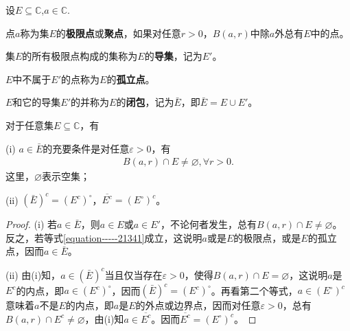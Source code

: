 \documentclass[../../main.tex]{subfiles}%
\begin{document}
\begin{definition}
设$E\subseteq \mathbb{C}$,$a\in \mathbb{C}$.

点\(a\)称为集\(E\)的\textbf{极限点}或\textbf{聚点}，如果对任意\(r > 0\)，\(B(a, r)\)中除\(a\)外总有\(E\)中的点。

集\(E\)的所有极限点构成的集称为\(E\)的\textbf{导集}，记为\(E'\)。

\(E\)中不属于\(E'\)的点称为\(E\)的\textbf{孤立点}。

\(E\)和它的导集\(E'\)的并称为\(E\)的\textbf{闭包}，记为\(\bar{E}\)，即\(\bar{E} = E \cup E'\)。
\end{definition}

\begin{proposition}\label{proposition:闭包的性质}
对于任意集\(E\subseteq \mathbb{C}\)，有

(i) \(a \in \bar{E}\)的充要条件是对任意\(\varepsilon > 0\)，有
\begin{align}
B(a, r) \cap E \neq \varnothing,\forall r>0.\label{equation-----21341}
\end{align}
这里，\(\varnothing\)表示空集；

(ii) \((\bar{E})^c = (E^c)^\circ\)，\(\overline{E^c} = (E^\circ)^c\)。
\end{proposition}
\begin{proof}

(i) 若\(a \in \bar{E}\)，则\(a \in E\)或\(a \in E'\)，不论何者发生，总有\(B(a, r) \cap E \neq \varnothing\)。反之，若等式\eqref{equation-----21341}成立，这说明\(a\)或是\(E\)的极限点，或是\(E\)的孤立点，因而\(a \in \bar{E}\)。

(ii) 由(i)知，\(a \in (\bar{E})^c\)当且仅当存在\(\varepsilon > 0\)，使得\(B(a, r) \cap E = \varnothing\)，这说明\(a\)是\(E^c\)的内点，即\(a \in (E^c)^\circ\)，因而\((\bar{E})^c = (E^c)^\circ\)。再看第二个等式，\(a \in (E^\circ)^c\)意味着\(a\)不是\(E\)的内点，即\(a\)是\(E\)的外点或边界点，因而对任意\(\varepsilon > 0\)，总有\(B(a, r) \cap E^c \neq \varnothing\)，由(i)知\(a \in \overline{E^c}\)。因而\(\overline{E^c} = (E^\circ)^c\)。 

\end{proof}
\end{document}
